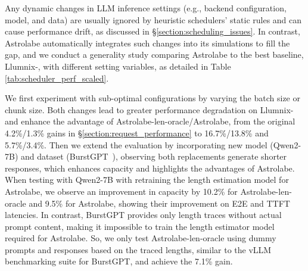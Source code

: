 \documentclass[sigconf, review, anonymous]{acmart}
\begin{document}
Any dynamic changes in LLM inference settings (e.g., backend configuration, model, and data) are usually ignored by heuristic schedulers' static rules and can cause performance drift, as discussed in \S\ref{section:scheduling_issues}. In contrast, Astrolabe automatically integrates such changes into its simulations to fill the gap, and we conduct a generality study comparing Astrolabe to the best baseline, Llumnix-, with different setting variables, as detailed in Table \ref{tab:scheduler_perf_scaled}.

We first experiment with sub-optimal configurations by varying the batch size or chunk size. Both changes lead to greater performance degradation on Llumnix- and enhance the advantage of Astrolabe-len-oracle/Astrolabe, from the original 4.2\%/1.3\% gains in \S\ref{section:request_performance} to 16.7\%/13.8\% and 5.7\%/3.4\%. Then we extend the evaluation by incorporating new model (Qwen2-7B\cite{yang2024qwen2technicalreport}) and dataset (BurstGPT~\cite{burstgpt}), observing both replacements generate shorter responses, which enhances capacity and highlights the advantages of Astrolabe. When testing with Qwen2-7B with retraining the length estimation model for Astrolabe, we observe an improvement in capacity by 10.2\% for Astrolabe-len-oracle and 9.5\% for Astrolabe, showing their improvement on E2E and TTFT latencies. In contrast, BurstGPT provides only length traces without actual prompt content, making it impossible to train the length estimator model required for Astrolabe. So, we only test Astrolabe-len-oracle using dummy prompts and responses based on the traced lengths, similar to the vLLM benchmarking suite for BurstGPT, and achieve the 7.1\% gain.


\end{document}
